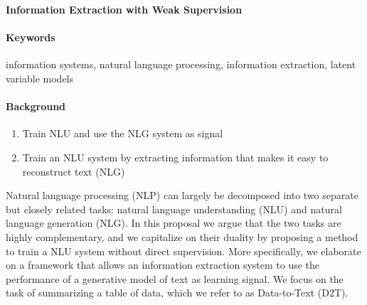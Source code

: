 \documentclass[11pt]{article}
\begin{document}

\begin{center}
\textbf{Information Extraction with Weak Supervision}
\end{center}

\begin{comment}
Spectrum from hard attention => hard segmental => HSMM for generative model, coverage / recall
Should we go into HSMM??? or is hard segmental attention enough

composition function = categorical over two entries of x

structured attention for IE posterior?
\end{comment}

\paragraph{Keywords}
information systems, natural language processing, information extraction,
latent variable models

\paragraph{Background}
\begin{enumerate}
\item Train NLU and use the NLG system as signal
\item Train an NLU system by extracting information that makes it 
easy to reconstruct text (NLG)
\end{enumerate}
Natural language processing (NLP) can largely be decomposed into two separate but
closely related tasks: natural language understanding (NLU) and natural language
generation (NLG).
In this proposal we argue that the two tasks are highly complementary,
and we capitalize on their duality by proposing a method to train a NLU system
without direct supervision.
More specifically, we elaborate on a framework that allows an information
extraction system to use the performance of a generative model of text as learning signal.
We focus on the task of summarizing a table of data,
which we refer to as Data-to-Text (D2T).
\end{document}
